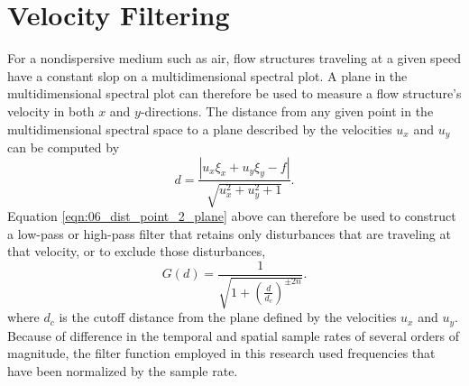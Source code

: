\section{Velocity Filtering}
\label{chap:06_velocity_filter}
For a nondispersive medium such as air, flow structures traveling at a given speed have a constant slop on a multidimensional spectral plot.
A plane in the multidimensional spectral plot can therefore be used to measure a flow structure's velocity in both $x$ and $y$-directions.
The distance from any given point in the multidimensional spectral space to a plane described by the velocities $u_x$ and $u_y$ can be computed by
\begin{equation}
 d = \frac{|u_x\xi_x+u_y\xi_y-f|}{\sqrt{u_x^2+u_y^2+1}} \textrm{.}
 \label{eqn:06_dist_point_2_plane}
\end{equation}
Equation \ref{eqn:06_dist_point_2_plane} above can therefore be used to construct a low-pass or high-pass filter that retains only disturbances that are traveling at that velocity, or to exclude those disturbances,
\begin{equation}
  G(d) = \frac{1}{\sqrt{1+\left(\frac{d}{d_c}\right)^{\pm2n}}} \textrm{.}
  \label{eqn:06_butterworth_velocity}
\end{equation}
where $d_c$ is the cutoff distance from the plane defined by the velocities $u_x$ and $u_y$.
Because of difference in the temporal and spatial sample rates of several orders of magnitude, the filter function employed in this research used frequencies that have been normalized by the sample rate.

